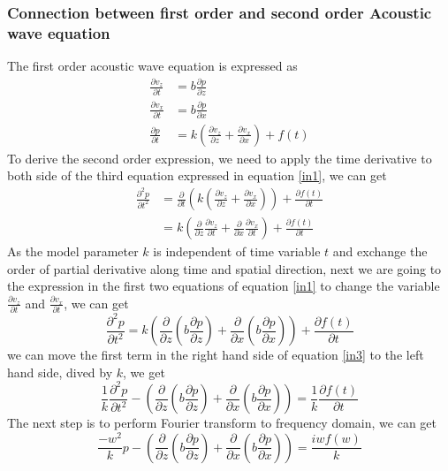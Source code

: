 \documentclass[revised,endfloat]{geophysics}
\begin{document}
\subsubsection{Connection between first order and second order Acoustic wave equation}
The first order acoustic wave equation is expressed  as
\begin{equation}
\begin{split}
 \frac{\partial v_z}{\partial t} &=  b \frac{\partial p}{\partial z}  \\
 \frac{\partial v_x}{\partial t} &=  b \frac{\partial p}{\partial x}  \\
\frac{\partial p}{\partial t} &= k \left(\frac{\partial v_z}{\partial z} + \frac{\partial v_x}{\partial x} \right) + f(t)
\end{split}
\label{in1}
\end{equation}
To derive the second order expression, we need to apply the time derivative to both side of the third equation expressed in equation \ref{in1}, we can get
\begin{equation}
\begin{split}
\frac{\partial^2 p}{\partial t^2} &= \frac{\partial}{\partial t}\left( k \left(\frac{\partial v_z}{\partial z} + \frac{\partial v_x}{\partial x} \right) \right) + \frac{\partial f(t)}{\partial t} \\
&=  k \left(\frac{\partial}{\partial z}\frac{\partial v_z}{\partial t} + \frac{\partial}{\partial x}\frac{\partial v_x}{\partial t} \right)  + \frac{\partial f(t)}{\partial t} 
\end{split}
\label{in2}
\end{equation}
As the model parameter $k$ is independent of time variable $t$ and exchange the order of 
partial derivative along time and spatial direction, next we are going to the expression in the first two equations of equation \ref{in1} to change the variable $\frac{\partial v_z}{\partial t}$ and  $\frac{\partial v_x}{\partial t}$, we can get
\begin{equation}
\frac{\partial^2 p}{\partial t^2} = k \left(  \frac{\partial}{\partial z} (b \frac{\partial p}{\partial z}) + \frac{\partial}{\partial x} (b \frac{\partial p}{\partial x})  \right) + \frac{\partial f(t)}{\partial t}
\label{in3}
\end{equation}
we can move the first term in the right hand side of equation \ref{in3} to the left hand side, dived by $k$, we get
\begin{equation}
\frac{1}{k}\frac{\partial^2 p}{\partial t^2} -  \left(  \frac{\partial}{\partial z} (b \frac{\partial p}{\partial z}) + \frac{\partial}{\partial x} (b \frac{\partial p}{\partial x})  \right) = \frac{1}{k}\frac{\partial f(t)}{\partial t}
\label{in4}
\end{equation}
The next step is to perform Fourier transform to frequency domain, we can get
\begin{equation}
\frac{-w^2}{k} p -  \left(  \frac{\partial}{\partial z} (b \frac{\partial p}{\partial z}) + \frac{\partial}{\partial x} (b \frac{\partial p}{\partial x})  \right) = \frac{iw f(w)}{k}
\label{in5}
\end{equation}
\end{document}
